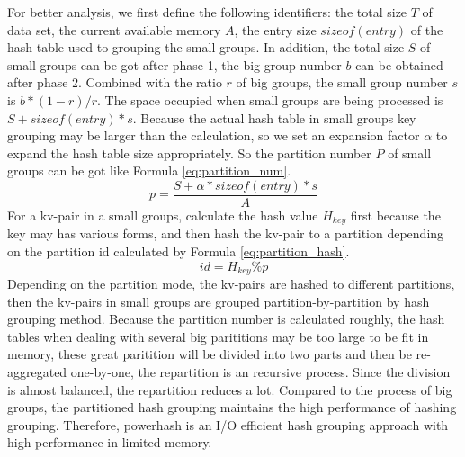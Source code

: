 For better analysis, we first define the following identifiers: the total size $T$ of data set, the current available memory $A$, the entry size $sizeof(entry)$ of the hash table used to grouping the small groups. In addition, the total size $S$ of small groups can be got after phase 1, the big group number $b$ can be obtained after phase 2. Combined with the ratio $r$ of big groups, the small group number $s$ is $b*(1-r)/r$. The space occupied when small groups are being processed is $S + sizeof(entry)*s$.
Because the actual hash table in small groups key grouping may be larger than the calculation, so we set an expansion factor $\alpha$ to expand the hash table size appropriately. So the partition number $P$ of small groups can be got like Formula \ref{eq:partition_num}. 
\begin{equation}\label{eq:partition_num}
    p = \dfrac{S + \alpha*sizeof(entry)*s}{A}
\end{equation}
For a kv-pair in a small groups, calculate the hash value $H_{key}$ first because the key may has various forms, and then hash the kv-pair to a partition depending on the partition id calculated by Formula \ref{eq:partition_hash}.
\begin{equation}\label{eq:partition_hash}
    id = H_{key} \%  p
\end{equation}  
Depending on the partition mode, the kv-pairs are hashed to different partitions, then the kv-pairs in small groups are grouped partition-by-partition by hash grouping method. Because the partition number is calculated roughly, the hash tables when dealing with several big parititions may be too large to be fit in memory, these great paritition will be divided into two parts and then be re-aggregated one-by-one, the repartition is an recursive process. Since the division is almost balanced, the repartition reduces a lot. Compared to the process of big groups, the partitioned hash grouping maintains the high performance of hashing grouping. Therefore, powerhash is an I/O efficient hash grouping approach with high performance in limited memory.  

